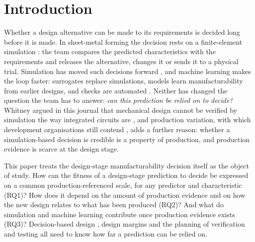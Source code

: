 \documentclass[pdflatex,sn-basic,lineno]{sn-jnl}
\begin{document}

\maketitle

\section{Introduction}\label{sec:intro}

Whether a design alternative can be made to its requirements is decided long before it is made. In sheet-metal forming the decision rests on a finite-element simulation \citep{banabic2010sheet}: the team compares the predicted characteristics with the requirements and releases the alternative, changes it or sends it to a physical trial. Simulation has moved such decisions forward \citep{thomke1998simulation}, and machine learning makes the loop faster: surrogates replace simulations, models learn manufacturability from earlier designs, and checks are automated \citep{yan2026machine, ghadai2018learning, zhang2018featurenet}. Neither has changed the question the team has to answer: \emph{can this prediction be relied on to decide?} Whitney argued in this journal that mechanical design cannot be verified by simulation the way integrated circuits are \citep{whitney1996why}, and production variation, with which development organisations still contend \citep{thornton2000more}, adds a further reason: whether a simulation-based decision is credible is a property of production, and production evidence is scarce at the design stage.

This paper treats the design-stage manufacturability decision itself as the object of study. How can the fitness of a design-stage prediction to decide be expressed on a common production-referenced scale, for any predictor and characteristic (RQ1)? How does it depend on the amount of production evidence and on how the new design relates to what has been produced (RQ2)? And what do simulation and machine learning contribute once production evidence exists (RQ3)? Decision-based design \citep{hazelrigg1998framework}, design margins \citep{eckert2019design} and the planning of verification and testing \citep{thomke2001sequential, salado2018mathematical, tahera2019testing} all need to know how far a prediction can be relied on.
\end{document}
